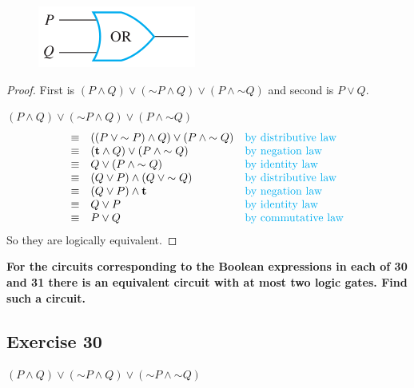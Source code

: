 \documentclass[14pt]{extarticle}
\newcommand{\true}{{\bf t}}
\begin{document}
\begin{figure}[ht!]
\centering
\includegraphics[scale=0.5]{../images/2.4.29.b.png}
\end{figure}

\begin{proof}
First is $(P \wedge Q) \vee ({\sim P} \wedge Q) \vee (P \wedge {\sim Q})$ and second is $P \vee Q$.

$(P \wedge Q) \vee ({\sim P} \wedge Q) \vee (P \wedge {\sim Q})$
$$
\begin{array}{cll}
\equiv & ((P \vee {\sim P}) \wedge Q) \vee (P \wedge {\sim Q}) & \text{\color{cyan}by distributive law} \\
\equiv & (\true \wedge Q) \vee (P \wedge {\sim Q}) & \text{\color{cyan}by negation law} \\
\equiv & Q \vee (P \wedge {\sim Q}) & \text{\color{cyan}by identity law} \\
\equiv & (Q \vee P) \wedge (Q \vee {\sim Q}) & \text{\color{cyan}by distributive law} \\
\equiv & (Q \vee P) \wedge \true & \text{\color{cyan}by negation law} \\
\equiv & Q \vee P & \text{\color{cyan}by identity law} \\
\equiv & P \vee Q & \text{\color{cyan}by commutative law} \\
\end{array}
$$
So they are logically equivalent.
\end{proof}

{\bf \color{cyan} For the circuits corresponding to the Boolean expressions in each of 30 and 31 there is an equivalent circuit with at most two logic gates. Find such a circuit.}

\subsection{Exercise 30}
$(P \wedge Q) \vee ({\sim P} \wedge Q) \vee ({\sim P} \wedge {\sim Q})$
\end{document}
